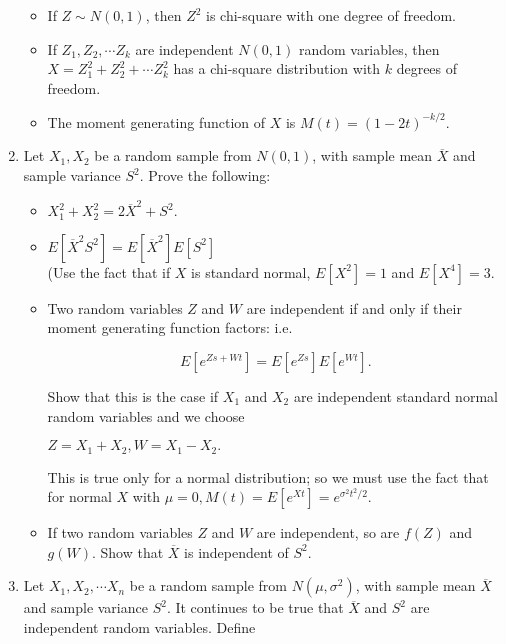 \documentclass[12pt]{article}
\begin{document}
\begin{enumerate}
\begin{itemize}
\item If $Z \sim N(0,1)$, then $Z^2$ is chi-square with one degree of freedom.
\vspace{160pt}
\item  If  $Z_1, Z_2, \cdots Z_k$ are independent $N(0,1)$ random variables, then $X = Z_1^2 + Z_2^2 + \cdots Z_k^2$ has a chi-square distribution with $k$ degrees of freedom.
\vspace{90pt}
\item The moment generating function of $X$ is $M(t) = (1-2t)^{-k/2}.$
\end{itemize}

\pagebreak

\item Let $X_1, X_2$ be a random sample from $N(0,1)$, with sample mean $\overline{X}$ and sample variance $S^2$. Prove the following:
\begin{itemize}
\item $X_1^2 + X_2^2 = 2 \overline{X}^2 + S^2.$
\vspace{150pt}


\item $E[\overline{X}^2S^2] = E[\overline{X}^2]E[S^2] $\\
(Use the fact that if $X$ is standard normal, $E[X^2] = 1$ and $E[X^4] = 3.$
\vspace{100pt}

\pagebreak

\item Two random variables $Z$ and $W$ are independent if and only if their moment generating function factors: i.e.

$$E[e^{Zs + Wt}] =  E[e^{Zs}] E[e^{Wt}] .$$

Show that this is the case if $X_1$ and $X_2$ are independent standard normal random variables and we choose

$Z  = X_1 + X_2, W = X_1 - X_2.$

This is true only for a normal distribution; so we must use the fact that for normal $X$ with $\mu = 0, M(t) = E[e^{Xt}] = e^{\sigma^2t^2/2}.$
\vspace{220pt}


\item If two random variables $Z$ and $W$ are independent, so are $f(Z)$ and $g(W).$ Show that $\overline{X}$ is independent of $S^2.$

\end{itemize}
\pagebreak

\item Let $X_1, X_2, \cdots X_n$ be a random sample from $N(\mu, \sigma^2)$, with sample mean $\overline{X}$ and sample variance $S^2$. 
It continues to be true that $\overline{X}$ and $S^2$ are independent random variables. 
Define 


\end{enumerate}
\end{document}
